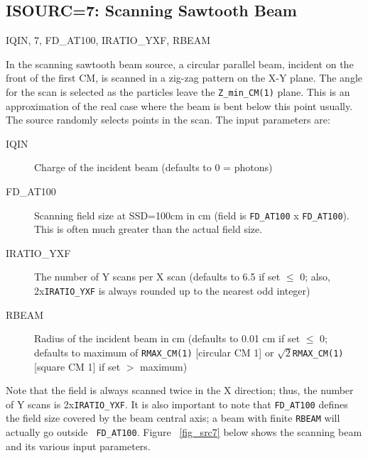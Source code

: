 \documentclass[12pt,twoside]{article}
\newcommand{\cen}[1]{\begin{center} #1 \end{center}                   }
\begin{document}
\clearpage

\subsection{ISOURC=7: Scanning Sawtooth Beam}
\cen{IQIN, 7, FD\_AT100, IRATIO\_YXF, RBEAM}
 

In the scanning sawtooth beam source, a circular parallel beam, incident on the
front of the first CM,
is scanned in a zig-zag pattern on the X-Y plane.   The angle for the
scan is selected as the particles leave the \verb+Z_min_CM(1)+ plane.
This is an approximation of the real case where the beam is bent below
this point usually.  The source randomly selects points in the scan.
The input parameters are:
\begin{description}
\item [IQIN] Charge of the incident beam (defaults to 0 = photons)
\item [FD\_AT100] Scanning field size at SSD=100cm in cm (field is
{\tt FD\_AT100} x {\tt FD\_AT100}). This is often much greater than the actual field
size.
\item [IRATIO\_YXF] The number of Y scans per X scan (defaults to 6.5 if
set $\leq$ 0; also, 2x{\tt IRATIO\_YXF} is always rounded up to the nearest odd
integer)
\item [RBEAM] Radius of the incident beam in cm (defaults to 0.01 cm if
set $\leq$ 0; defaults to maximum of \verb+RMAX_CM(1)+ [circular CM 1] or
$\sqrt{2}$\verb+RMAX_CM(1)+ [square CM 1] if set $>$ maximum)
\end{description}
Note that the field is always scanned twice in the X direction; thus,
the number of Y scans is 2x{\tt IRATIO\_YXF}.  It is also important to note
that {\tt FD\_AT100} defines the field size covered by the beam central axis;
a beam with finite \verb+RBEAM+ will actually go outside {\tt
FD\_AT100}.
Figure ~\ref{fig_src7} below shows the scanning beam and its various
input parameters.
\end{document}

